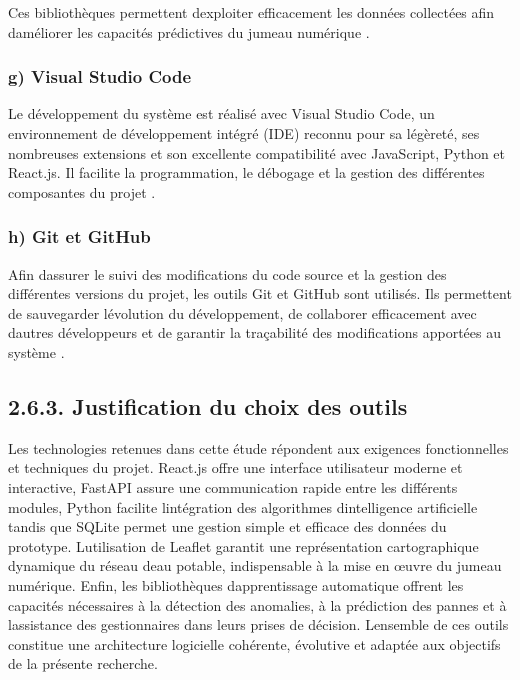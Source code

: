 \documentclass[12pt,a4paper,oneside]{report}
\begin{document}
Ces bibliothèques permettent d\textquotesingle exploiter efficacement
les données collectées afin d\textquotesingle améliorer les capacités
prédictives du jumeau numérique \cite{ref120}.

\subsubsection{g) Visual Studio Code}\label{g-visual-studio-code}

Le développement du système est réalisé avec Visual Studio Code, un
environnement de développement intégré (IDE) reconnu pour sa légèreté,
ses nombreuses extensions et son excellente compatibilité avec
JavaScript, Python et React.js. Il facilite la programmation, le
débogage et la gestion des différentes composantes du projet \cite{ref121}.

\subsubsection{h) Git et GitHub}\label{h-git-et-github}

Afin d\textquotesingle assurer le suivi des modifications du code source
et la gestion des différentes versions du projet, les outils Git et
GitHub sont utilisés. Ils permettent de sauvegarder
l\textquotesingle évolution du développement, de collaborer efficacement
avec d\textquotesingle autres développeurs et de garantir la traçabilité
des modifications apportées au système \cite{ref122}.

\subsection{\texorpdfstring{\textbf{2.6.3. Justification du choix des
outils}}{2.6.3. Justification du choix des outils}}\label{justification-du-choix-des-outils}

Les technologies retenues dans cette étude répondent aux exigences
fonctionnelles et techniques du projet. React.js offre une interface
utilisateur moderne et interactive, FastAPI assure une communication
rapide entre les différents modules, Python facilite
l\textquotesingle intégration des algorithmes
d\textquotesingle intelligence artificielle tandis que SQLite permet une
gestion simple et efficace des données du prototype.
L\textquotesingle utilisation de Leaflet garantit une représentation
cartographique dynamique du réseau d\textquotesingle eau potable,
indispensable à la mise en œuvre du jumeau numérique. Enfin, les
bibliothèques d\textquotesingle apprentissage automatique offrent les
capacités nécessaires à la détection des anomalies, à la prédiction des
pannes et à l\textquotesingle assistance des gestionnaires dans leurs
prises de décision. L\textquotesingle ensemble de ces outils constitue
une architecture logicielle cohérente, évolutive et adaptée aux
objectifs de la présente recherche.
\end{document}
